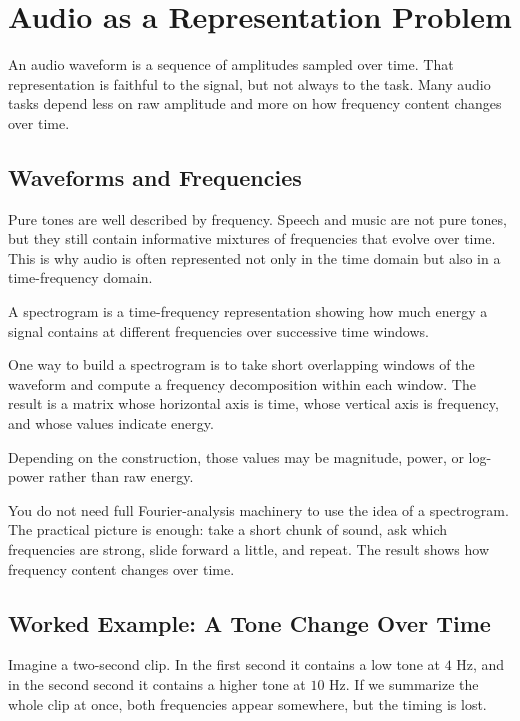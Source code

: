 \section{Audio as a Representation Problem}

An audio waveform is a sequence of amplitudes sampled over time. That representation is faithful to the signal, but not always to the task. Many audio tasks depend less on raw amplitude and more on how frequency content changes over time.

\subsection{Waveforms and Frequencies}

Pure tones are well described by frequency. Speech and music are not pure tones, but they still contain informative mixtures of frequencies that evolve over time. This is why audio is often represented not only in the time domain but also in a time-frequency domain.

\begin{definition}[Spectrogram]
A spectrogram is a time-frequency representation showing how much energy a signal contains at different frequencies over successive time windows.
\end{definition}

One way to build a spectrogram is to take short overlapping windows of the waveform and compute a frequency decomposition within each window. The result is a matrix whose horizontal axis is time, whose vertical axis is frequency, and whose values indicate energy.

Depending on the construction, those values may be magnitude, power, or log-power rather than raw energy.

\begin{prereqbridge}
You do not need full Fourier-analysis machinery to use the idea of a spectrogram. The practical picture is enough: take a short chunk of sound, ask which frequencies are strong, slide forward a little, and repeat. The result shows how frequency content changes over time.
\end{prereqbridge}

\subsection{Worked Example: A Tone Change Over Time}

Imagine a two-second clip. In the first second it contains a low tone at $4$ Hz, and in the second second it contains a higher tone at $10$ Hz. If we summarize the whole clip at once, both frequencies appear somewhere, but the timing is lost.

